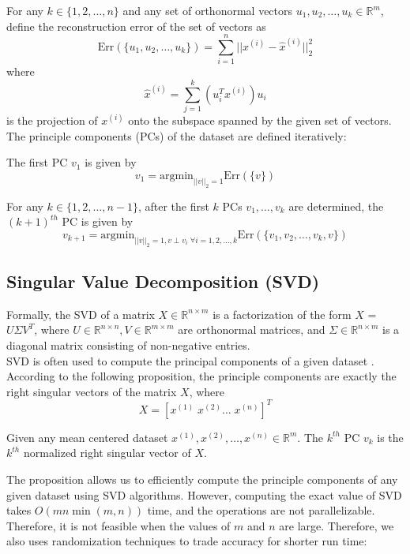 \noindent
For any $k \in \{1,2, \ldots,  n\}$ and any set of orthonormal vectors $  u_1, u_2, \ldots, u_k \in  \mathbb{R}^{m}$, define the reconstruction error of the set of vectors as $$ \text{Err} (\{ u_1, u_2, \ldots, u_k\}) =  \sum_{i=1}^{n} || x^{(i)} - {  \hat{x}^{(i)}  }||_2^2$$ where $$\hat{x}^{(i)}   = \sum_{j=1}^{k} (u_i^{T} x^{(i)} )u_i  $$ is the projection of $x^{(i)} $ onto the subspace spanned by the given set of vectors.\\

\noindent The principle components (PCs) of the dataset are defined iteratively:

\noindent
The first PC $v_1$ is given by $$v_1 =  \text{argmin}_{||v||_2 =  1}  \text{Err} (\{v\}) $$

\noindent
For any $k \in \{1,2,\ldots, n-1\}$, after the first $k$ PCs $v_1, \ldots, v_k$ are determined, the $(k+1)^{th}$ PC is given by $$ v_{k+1} =  \text{argmin}_{||v||_2 =  1, v \perp v_i \; \forall i =1,2, \ldots, k}  \text{Err} (\{v_1, v_2, \ldots, v_k, v\}) $$


\subsection{Singular Value Decomposition (SVD)}
Formally, the SVD of a matrix $X \in \mathbb{R}^{n \times m}$ is a factorization of the form $X$ = $U \Sigma V^{T}$, where $U \in \mathbb{R}^{n \times n}, V \in \mathbb{R}^{m \times m}$ are orthonormal matrices, and $\Sigma \in \mathbb{R}^{n \times m}$ is a diagonal matrix consisting of non-negative entries.\\



\noindent SVD is often used to compute the principal components of a given dataset \cite{pca_via_svd}.  According to the following proposition, the principle components are exactly the right singular vectors of the matrix $X$, where $$X = [x^{(1)} \; x^{(2)} \ldots \; x^{(n)} ]^T$$
\noindent \begin{prop} \label{5.1}
Given any mean centered dataset $ x^{(1)}, x^{(2)}, \ldots, x^{(n)} \in \mathbb{R}^{m}$. The $k^{th}$ PC $v_k$ is the $k^{th}$ normalized right singular vector of $X$.
\end{prop}



\noindent The proposition allows us to efficiently compute the principle components of any given dataset using SVD algorithms. However, computing the exact value of SVD takes $O(mn \min (m,n))$ time, and the operations are not parallelizable. Therefore, it is not feasible when the values of $m$ and $n$ are large. Therefore, we also uses randomization techniques to trade accuracy for shorter run time:

